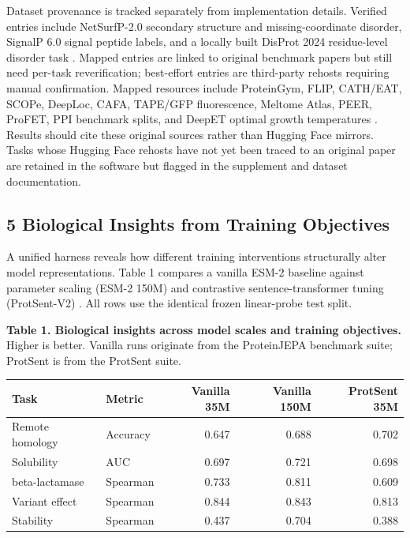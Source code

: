\documentclass[
]{article}
\newcounter{none} %
\begin{document}
Dataset provenance is tracked separately from implementation details.
Verified entries include NetSurfP-2.0 secondary structure and
missing-coordinate disorder, SignalP 6.0 signal peptide labels, and a
locally built DisProt 2024 residue-level disorder task
\autocite{klausen2019netsurfp,teufel2022signalp,aspromonte2024disprot}.
Mapped entries are linked to original benchmark papers but still need
per-task reverification; best-effort entries are third-party rehosts
requiring manual confirmation. Mapped resources include ProteinGym,
FLIP, CATH/EAT, SCOPe, DeepLoc, CAFA, TAPE/GFP fluorescence, Meltome
Atlas, PEER, ProFET, PPI benchmark splits, and DeepET optimal growth
temperatures
\autocite{notin2023proteingym,dallago2021flip,heinzinger2022contrastive,fox2014scope,almagro2017deeploc,zhou2019cafa,rao2019tape,sarkisyan2016local,jarzab2020meltome,xu2022peer,ofer2015profet,bernett2024ppi,li2022deepet}.
Results should cite these original sources rather than Hugging Face
mirrors. Tasks whose Hugging Face rehosts have not yet been traced to an
original paper are retained in the software but flagged in the
supplement and dataset documentation.

\subsection{5 Biological Insights from Training
Objectives}\label{biological-insights-from-training-objectives}

A unified harness reveals how different training interventions
structurally alter model representations. Table 1 compares a vanilla
ESM-2 baseline against parameter scaling (ESM-2 150M) and contrastive
sentence-transformer tuning (ProtSent-V2) \autocite{protsent2026}. All
rows use the identical frozen linear-probe test split.

\textbf{Table 1. Biological insights across model scales and training
objectives.} Higher is better. Vanilla runs originate from the
ProteinJEPA benchmark suite; ProtSent is from the ProtSent suite.

{\def\LTcaptype{none} %
\begin{longtable}[]{@{}llrrr@{}}
\toprule\noalign{}
Task & Metric & Vanilla 35M & Vanilla 150M & ProtSent 35M \\
\midrule\noalign{}
\endhead
\bottomrule\noalign{}
\endlastfoot
Remote homology & Accuracy & 0.647 & 0.688 & 0.702 \\
Solubility & AUC & 0.697 & 0.721 & 0.698 \\
beta-lactamase & Spearman & 0.733 & 0.811 & 0.609 \\
Variant effect & Spearman & 0.844 & 0.843 & 0.813 \\
Stability & Spearman & 0.437 & 0.704 & 0.388 \\
\end{longtable}
}
\end{document}
